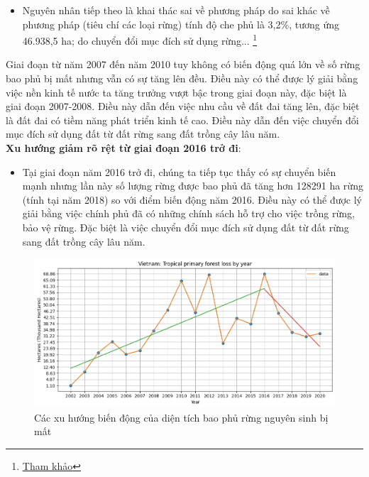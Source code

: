 \documentclass[a4paper,12pt]{report}
\begin{document}
\begin{flushleft}
\begin{itemize}
		\item Nguyên nhân tiếp theo là khai thác sai về phương pháp do sai khác về phương pháp (tiêu chí các loại rừng) tính độ che phủ là 3,2\%, tương ứng 46.938,5 ha; do chuyển đổi mục đích sử dụng rừng... \footnote{\textcolor{blue}{\underline{\href{https://tuoitre.vn/giam-130000-ha-rung-co-quan-nao-chiu-trach-nhiem-684381.htm}{Tham khảo}}}}
	\end{itemize}

	Giai đoạn từ năm 2007 đến năm 2010 tuy không có biến động quá lớn về số rừng bao phủ bị mất nhưng vẫn có sự tăng lên đều. Điều này có thể được lý giải bằng việc nền kinh tế nước ta tăng trưởng vượt bậc trong giai đoạn này, đặc biệt là giai đoạn 2007-2008. Điều này dẫn đến việc nhu cầu về đất đai tăng lên, đặc biệt là đất đai có tiềm năng phát triển kinh tế cao. Điều này dẫn đến việc chuyển đổi mục đích sử dụng đất từ đất rừng sang đất trồng cây lâu năm.
	\\[\baselineskip]

	\textbf{Xu hướng giảm rõ rệt từ giai đoạn 2016 trở đi}:
	\begin{itemize}
		\item Tại giai đoạn năm 2016 trở đi, chúng ta tiếp tục thấy có sự chuyển biến mạnh nhưng lần này số lượng rừng được bao phủ đã tăng hơn 128291 ha rừng (tính tại năm 2018) so với điểm biến động năm 2016. Điều này có thể được lý giải bằng việc chính phủ đã có những chính sách hỗ trợ cho việc trồng rừng, bảo vệ rừng. Đặc biệt là việc chuyển đổi mục đích sử dụng đất từ đất rừng sang đất trồng cây lâu năm.
	\end{itemize}

	\begin{figure}[H]
			\centering
			\includegraphics[width = \textwidth]{images/tropical_primary_forest_loss_by_year_trends.png}
			\caption{Các xu hướng biến động của diện tích bao phủ rừng nguyên sinh bị mất}
	\end{figure}


\end{flushleft}
\end{document}
